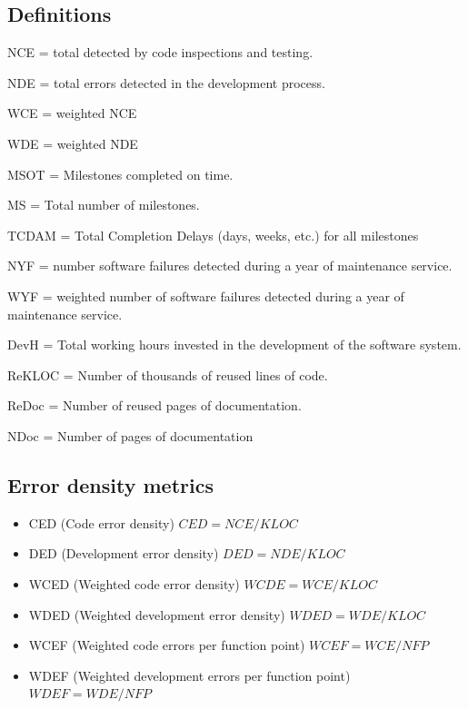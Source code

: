 \documentclass{article}
\begin{document}
\subsection{Definitions}

\begin{flushleft}
  \item NCE = total detected by code inspections and testing.
  \item NDE = total errors detected in the development process.
  \item WCE = weighted NCE
  \item WDE = weighted NDE
  \item MSOT = Milestones completed on time.
  \item MS = Total number of milestones.
  \item TCDAM = Total Completion Delays (days, weeks, etc.) for all milestones
  \item NYF = number software failures detected during a year of maintenance service.
  \item WYF = weighted number of software failures detected during a year of maintenance service.
  \item DevH = Total working hours invested in the development of the software system.
  \item ReKLOC = Number of thousands of reused lines of code.
  \item ReDoc = Number of reused pages of documentation.
  \item NDoc = Number of pages of documentation
\end{flushleft}

\subsection{Error density metrics}

\begin{itemize}  
  \item CED (Code error density) $CED = NCE / KLOC$
  \item DED (Development error density) $DED = NDE /KLOC $
  \item WCED (Weighted code error density) $WCDE = WCE / KLOC$
  \item WDED (Weighted development error density) $WDED = WDE / KLOC$
  \item WCEF (Weighted code errors per function point) $WCEF = WCE / NFP $
  \item WDEF (Weighted development errors per function point) $WDEF = WDE / NFP$
\end{itemize}
\end{document}
